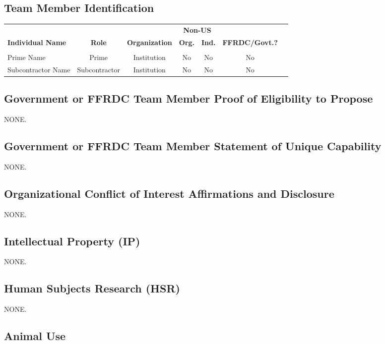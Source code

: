
\subsection{Team Member Identification}

{
  \small
  \centering
\begin{tabularx}{\textwidth}{Xcccccc}
  \hline 
    & & & \multicolumn{2}{c}{\textbf{Non-US}} & \\
  \textbf{Individual Name}
    & \textbf{Role}
    & \textbf{Organization}
    & \textbf{Org.}
    & \textbf{Ind.}
    & \textbf{FFRDC/Govt.?} \\
\hline \\
Prime Name & Prime & Institution & No & No & No \\
Subcontractor Name & Subcontractor & Institution & No & No & No \\
\hline

\end{tabularx}
}

\subsection{Government or FFRDC Team Member Proof of Eligibility to Propose}

NONE.

\subsection{Government or FFRDC Team Member Statement of Unique Capability}

NONE.

\subsection{Organizational Conflict of Interest Affirmations and Disclosure}

NONE.

\subsection{Intellectual Property (IP)}

NONE.

\subsection{Human Subjects Research (HSR)}

NONE.

\subsection{Animal Use}

